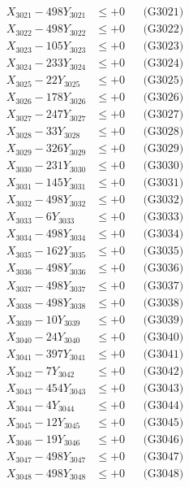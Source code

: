 \documentclass[a4paper,10pt]{article}
\begin{document}
{\begin{align}
\allowbreak
X_{3021} - 498Y_{3021} &\leq +0 && \text{(G3021)} \\
X_{3022} - 498Y_{3022} &\leq +0 && \text{(G3022)} \\
X_{3023} - 105Y_{3023} &\leq +0 && \text{(G3023)} \\
X_{3024} - 233Y_{3024} &\leq +0 && \text{(G3024)} \\
X_{3025} - 22Y_{3025} &\leq +0 && \text{(G3025)} \\
X_{3026} - 178Y_{3026} &\leq +0 && \text{(G3026)} \\
X_{3027} - 247Y_{3027} &\leq +0 && \text{(G3027)} \\
X_{3028} - 33Y_{3028} &\leq +0 && \text{(G3028)} \\
X_{3029} - 326Y_{3029} &\leq +0 && \text{(G3029)} \\
X_{3030} - 231Y_{3030} &\leq +0 && \text{(G3030)} \\
\allowbreak
X_{3031} - 145Y_{3031} &\leq +0 && \text{(G3031)} \\
X_{3032} - 498Y_{3032} &\leq +0 && \text{(G3032)} \\
X_{3033} - 6Y_{3033} &\leq +0 && \text{(G3033)} \\
X_{3034} - 498Y_{3034} &\leq +0 && \text{(G3034)} \\
X_{3035} - 162Y_{3035} &\leq +0 && \text{(G3035)} \\
X_{3036} - 498Y_{3036} &\leq +0 && \text{(G3036)} \\
X_{3037} - 498Y_{3037} &\leq +0 && \text{(G3037)} \\
X_{3038} - 498Y_{3038} &\leq +0 && \text{(G3038)} \\
X_{3039} - 10Y_{3039} &\leq +0 && \text{(G3039)} \\
X_{3040} - 24Y_{3040} &\leq +0 && \text{(G3040)} \\
\allowbreak
X_{3041} - 397Y_{3041} &\leq +0 && \text{(G3041)} \\
X_{3042} - 7Y_{3042} &\leq +0 && \text{(G3042)} \\
X_{3043} - 454Y_{3043} &\leq +0 && \text{(G3043)} \\
X_{3044} - 4Y_{3044} &\leq +0 && \text{(G3044)} \\
X_{3045} - 12Y_{3045} &\leq +0 && \text{(G3045)} \\
X_{3046} - 19Y_{3046} &\leq +0 && \text{(G3046)} \\
X_{3047} - 498Y_{3047} &\leq +0 && \text{(G3047)} \\
X_{3048} - 498Y_{3048} &\leq +0 && \text{(G3048)} \\

\end{align}}
\end{document}
